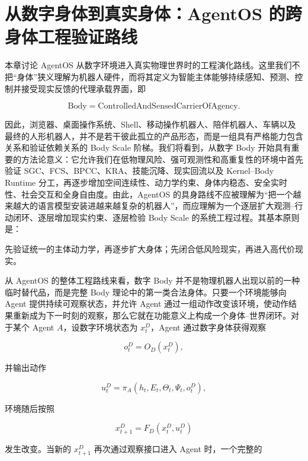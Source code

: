 \chapter{从数字身体到真实身体：AgentOS 的跨身体工程验证路线}

\begin{chapterlead}
本章讨论 AgentOS 从数字环境进入真实物理世界时的工程演化路线。这里我们不把“身体”狭义理解为机器人硬件，而将其定义为智能主体能够持续感知、预测、控制并接受现实反馈的代理承载界面，即

$$
\mathrm{Body}
=
\mathrm{ControlledAndSensedCarrierOfAgency}.
$$

因此，浏览器、桌面操作系统、Shell、移动操作机器人、陪伴机器人、车辆以及最终的人形机器人，并不是若干彼此孤立的产品形态，而是一组具有严格能力包含关系和验证依赖关系的 Body Scale 阶梯。我们将看到，从数字 Body 开始具有重要的方法论意义：它允许我们在低物理风险、强可观测性和高重复性的环境中首先验证 SGC、FCS、BPCC、KRA、技能沉降、现实回流以及 Kernel--Body Runtime 分工，再逐步增加空间连续性、动力学约束、身体内稳态、安全实时性、社会交互和全身自由度。由此，AgentOS 的具身路线不应被理解为“把一个越来越大的语言模型安装进越来越复杂的机器人”，而应理解为一个逐层扩大观测--行动闭环、逐层增加现实约束、逐层检验 Body Scale 的系统工程过程。其基本原则是：

\begin{statementbox}
先验证统一的主体动力学，再逐步扩大身体；先闭合低风险现实，再进入高代价现实。
\end{statementbox}
\end{chapterlead}


从 AgentOS 的整体工程路线来看，数字 Body 并不是物理机器人出现以前的一种临时替代品，而是完整 Body 理论中的第一类合法身体。只要一个环境能够向 Agent 提供持续可观察状态，并允许 Agent 通过一组动作改变该环境，使动作结果重新成为下一时刻的观察，那么它就在功能意义上构成一个身体--世界闭环。对于某个 Agent $A$，设数字环境状态为 $x_t^{D}$，Agent 通过数字身体获得观察

$$
o_t^{D}=O_D(x_t^{D}),
$$

并输出动作

$$
u_t^{D}=\pi_A(h_t,E_t,\Theta_t,\Psi_t,o_t^{D}),
$$

环境随后按照

$$
x_{t+1}^{D}=F_D(x_t^{D},u_t^{D})
$$

发生改变。当新的 $x_{t+1}^{D}$ 再次通过观察接口进入 Agent 时，一个完整的

\begin{statementbox}
\centering
{}
\end{statementbox}

